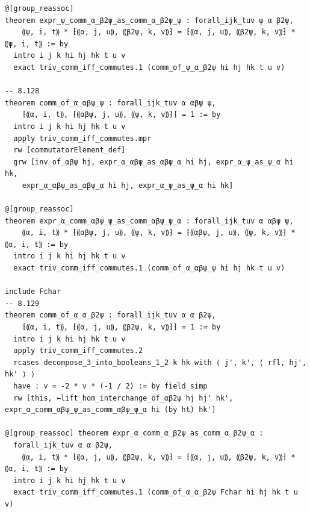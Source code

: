 \begin{Verbatim}
@[group_reassoc]
theorem expr_ψ_comm_α_β2ψ_as_comm_α_β2ψ_ψ : forall_ijk_tuv ψ α β2ψ,
    ⸨ψ, i, t⸩ * ⁅⸨α, j, u⸩, ⸨β2ψ, k, v⸩⁆ = ⁅⸨α, j, u⸩, ⸨β2ψ, k, v⸩⁆ * ⸨ψ, i, t⸩ := by
  intro i j k hi hj hk t u v
  exact triv_comm_iff_commutes.1 (comm_of_ψ_α_β2ψ hi hj hk t u v)

-- 8.128
theorem comm_of_α_αβψ_ψ : forall_ijk_tuv α αβψ ψ,
    ⁅⸨α, i, t⸩, ⁅⸨αβψ, j, u⸩, ⸨ψ, k, v⸩⁆⁆ = 1 := by
  intro i j k hi hj hk t u v
  apply triv_comm_iff_commutes.mpr
  rw [commutatorElement_def]
  grw [inv_of_αβψ hj, expr_α_αβψ_as_αβψ_α hi hj, expr_α_ψ_as_ψ_α hi hk,
    expr_α_αβψ_as_αβψ_α hi hj, expr_α_ψ_as_ψ_α hi hk]

@[group_reassoc]
theorem expr_α_comm_αβψ_ψ_as_comm_αβψ_ψ_α : forall_ijk_tuv α αβψ ψ,
    ⸨α, i, t⸩ * ⁅⸨αβψ, j, u⸩, ⸨ψ, k, v⸩⁆ = ⁅⸨αβψ, j, u⸩, ⸨ψ, k, v⸩⁆ * ⸨α, i, t⸩ := by
  intro i j k hi hj hk t u v
  exact triv_comm_iff_commutes.1 (comm_of_α_αβψ_ψ hi hj hk t u v)

include Fchar
-- 8.129
theorem comm_of_α_α_β2ψ : forall_ijk_tuv α α β2ψ,
    ⁅⸨α, i, t⸩, ⁅⸨α, j, u⸩, ⸨β2ψ, k, v⸩⁆⁆ = 1 := by
  intro i j k hi hj hk t u v
  apply triv_comm_iff_commutes.2
  rcases decompose_3_into_booleans_1_2 k hk with ⟨ j', k', ⟨ rfl, hj', hk' ⟩ ⟩
  have : v = -2 * v * (-1 / 2) := by field_simp
  rw [this, ←lift_hom_interchange_of_αβ2ψ hj hj' hk', expr_α_comm_αβψ_ψ_as_comm_αβψ_ψ_α hi (by ht) hk']

@[group_reassoc] theorem expr_α_comm_α_β2ψ_as_comm_α_β2ψ_α :
  forall_ijk_tuv α α β2ψ,
    ⸨α, i, t⸩ * ⁅⸨α, j, u⸩, ⸨β2ψ, k, v⸩⁆ = ⁅⸨α, j, u⸩, ⸨β2ψ, k, v⸩⁆ * ⸨α, i, t⸩ := by
  intro i j k hi hj hk t u v
  exact triv_comm_iff_commutes.1 (comm_of_α_α_β2ψ Fchar hi hj hk t u v)


\end{Verbatim}

